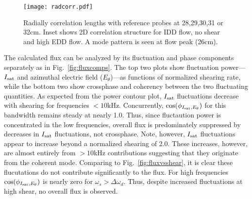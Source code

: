 \documentclass[aps,prl,amsmath,amssymb,preprint,superscriptaddress]{revtex4}
\begin{document}
\begin{figure}
\begin{center}
\texttt{[image: radcorr.pdf]}%
\caption{\label{fig:radcorr} Radially correlation lengths with reference probes at 28,29,30,31 or 32cm. Inset shows 2D correlation structure for IDD flow, no shear and high EDD flow. A mode pattern is seen at flow peak (26cm).}
\end{center}
\end{figure}

The calculated flux can be analyzed by its fluctuation and phase components separately as in Fig.~\ref{fig:fluxcomps}. The top two plots show fluctuation power---$I_{\rm sat}$ and azimuthal electric field ($E_{\theta}$)---as functions of normalized shearing rate, while the bottom two show crossphase and coherency between the two fluctuating quantities. As expected from the power contour plot, $I_{\rm sat}$ fluctuations decrease with shearing for frequencies $<10$kHz. Concurrently, $\cos(\phi_{I_{\rm sat},E_{\theta}})$ for this bandwidth remains steady at nearly 1.0. Thus, since fluctaution power is concentrated in the low frequencies, overall flux is predominately suppressed by decreases in $I_{\rm sat}$ fluctuations, not crossphase. Note, however, $I_{\rm sat}$ fluctuations appear to increase beyond a normalized shearing of 2.0. These increases, however, are almost entirely from $>10$kHz contributions suggesting that they originate from the coherent mode. Comparing to Fig.~\ref{fig:fluxvsshear}, it is clear these flucutations do not contribute significantly to the flux. For high frequencies $\cos(\phi_{I_{\rm sat},E_{\theta}})$ is nearly zero for $\omega_{s} > \Delta \omega_{d}$. Thus, despite increased fluctuations at high shear, no overall flux is observed. 

\end{document}
